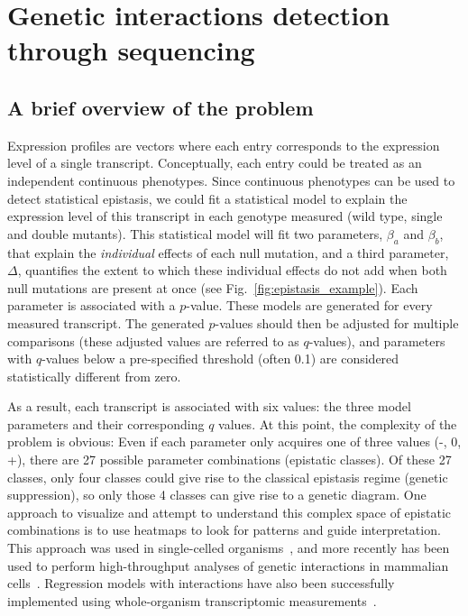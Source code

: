 \section*{Genetic interactions detection through sequencing}
\subsection*{A brief overview of the problem}
Expression profiles are vectors where each entry corresponds to the expression
level of a single transcript. Conceptually, each entry could be treated as an
independent continuous phenotypes. Since continuous phenotypes can be used to
detect statistical epistasis, we could fit a statistical model to explain the
expression level of this transcript in each genotype measured (wild type, single
and double mutants). This statistical model will fit two parameters, \(\beta_a\)
and \(\beta_b\), that explain the \emph{individual} effects of each null
mutation, and a third parameter, \(\Delta \), quantifies the extent to which
these individual effects do not add when both null mutations are present at
once (see Fig.~\ref{fig:epistasis_example}). Each parameter is associated with a
\(p\)-value. These models are generated for every measured transcript. The
generated \(p\)-values should then be adjusted for multiple comparisons (these
adjusted values are referred to as \(q\)-values), and parameters with
\(q\)-values below a pre-specified threshold (often 0.1) are considered
statistically different from zero.

As a result, each transcript is associated with six values: the three model
parameters and their corresponding \(q\) values. At this point, the complexity
of the problem is obvious: Even if each parameter only acquires one of three
values (-, 0, +), there are 27 possible parameter combinations (epistatic
classes). Of these 27 classes, only four classes could give rise to the
classical epistasis regime (genetic suppression), so only those 4 classes can
give rise to a genetic diagram. One approach to visualize and attempt to
understand this complex space of epistatic combinations is to use heatmaps to
look for patterns and guide interpretation. This approach was used in
single-celled
organisms~\citep{Capaldi2008,VanDriessche2005,Sameith2015,VanDePeppel2005}, and
more recently has been used to perform high-throughput analyses of genetic
interactions in mammalian cells~\citep{Dixit2016}. Regression models with
interactions have also been successfully implemented using whole-organism
transcriptomic measurements~\citep{Angeles-Albores2017}.

